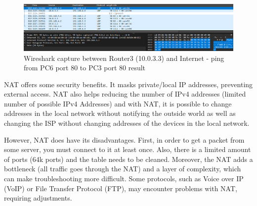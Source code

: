 \documentclass[10pt,a4paper]{ULBreport}
\begin{document}
\begin{figure}[H]
    \centering
    \includegraphics[width=\textwidth]{nattime.png}
    \caption{Wireshark capture between Router3 (10.0.3.3) and Internet - ping from PC6 port 80 to PC3 port 80 result}
    \label{nattime}
\end{figure}



NAT offers some security benefits. It masks private/local IP addresses, preventing external access. NAT also helps reducing the number of IPv4 addresses (limited number of possible IPv4 Addresses) and with NAT, it is possible to change addresses in the local network without notifying the outside world as well as changing the ISP without changing addresses of the devices in the local network.

However, NAT does have its disadvantages. First, in order to get a packet from some server, you must connect to it at least once. Also, there is a limited amount of ports (64k ports) and the table needs to be cleaned. Moreover, the NAT adds a bottleneck (all traffic goes through the NAT) and a layer of complexity, which can make troubleshooting more difficult. Some protocols, such as Voice over IP (VoIP) or File Transfer Protocol (FTP), may encounter problems with NAT, requiring adjustments.
\end{document}
